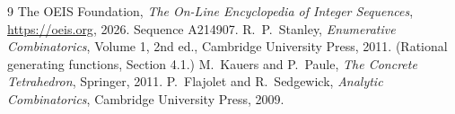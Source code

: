 \documentclass[11pt,a4paper]{article}
\theoremstyle{plain}
\theoremstyle{definition}
\begin{document}
\begin{thebibliography}{9}
 The OEIS Foundation, \emph{The On-Line Encyclopedia of Integer
Sequences}, \url{https://oeis.org}, 2026. Sequence A214907.
 R.~P.~Stanley, \emph{Enumerative Combinatorics}, Volume 1, 2nd ed.,
Cambridge University Press, 2011. (Rational generating functions, Section 4.1.)
 M.~Kauers and P.~Paule, \emph{The Concrete Tetrahedron}, Springer, 2011.
 P.~Flajolet and R.~Sedgewick, \emph{Analytic Combinatorics}, Cambridge
University Press, 2009.
\end{thebibliography}
\end{document}
